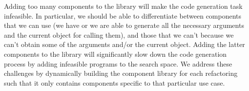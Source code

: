 \documentclass[sigconf,review,anonymous]{acmart}
\begin{document}
Adding too many components to the library will
make the code generation task infeasible. In particular, we should
be able to differentiate between components that we can use
(we have or we are able to generate
all the necessary arguments and the current object for calling them), and those
that we can't because we can't obtain some of the arguments
and/or the current object. Adding the latter components to the library will
significantly slow down the code generation process by
adding infeasible programs to the search space.
We address these challenges by dynamically building the component library for each refactoring
such that it only contains components specific to that particular use case.






\end{document}
